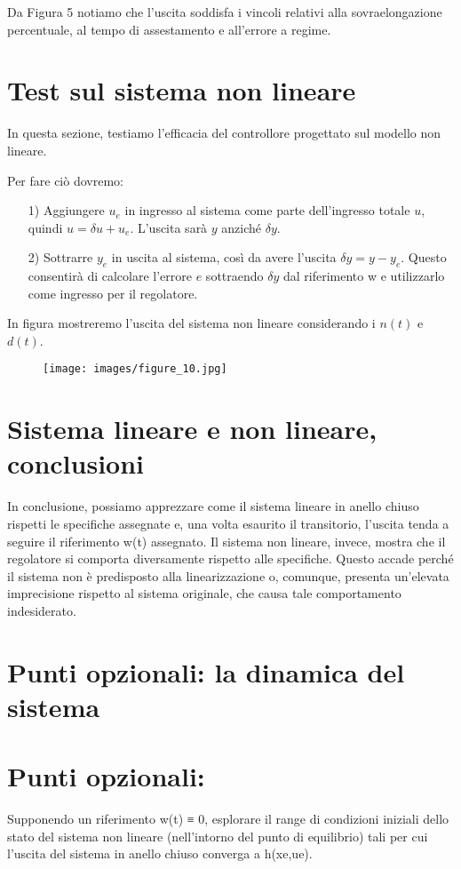 \documentclass[a4paper, 11pt]{article}
\begin{document}
Da Figura 5 notiamo che l'uscita soddisfa i vincoli relativi alla sovraelongazione percentuale, al tempo di assestamento e all'errore a regime.

\section{Test sul sistema non lineare}

In questa sezione, testiamo l'efficacia del controllore progettato sul modello non lineare.

Per fare ciò dovremo:

\begin{itemize}
	\item[1)] Aggiungere $u_e$ in ingresso al sistema come parte dell'ingresso totale $u$, quindi $u = \delta u + u_e$. L'uscita sarà $y$ anziché $\delta y$.
 \\
        \item[2)]Sottrarre $y_e$ in uscita al sistema, così da avere l'uscita $\delta y = y - y_e$. Questo consentirà di calcolare l'errore $e$ sottraendo $\delta y$ dal riferimento w e utilizzarlo come ingresso per il regolatore.
\end{itemize}

In figura mostreremo l'uscita del sistema non lineare considerando i $n(t)$ e $d(t)$.
\begin{figure}[H]
    \centering
\texttt{[image: images/figure\_10.jpg]}
    \caption{}
    \label{Figura9}
\end{figure}
\section{Sistema lineare e non lineare, conclusioni}

In conclusione, possiamo apprezzare come il sistema lineare in anello chiuso rispetti le specifiche assegnate e, una volta esaurito il transitorio, l'uscita tenda a seguire il riferimento w(t) assegnato. Il sistema non lineare, invece, mostra che il regolatore si comporta diversamente rispetto alle specifiche. Questo accade perché il sistema non è predisposto alla linearizzazione o, comunque, presenta un'elevata imprecisione rispetto al sistema originale, che causa tale comportamento indesiderato.

\section{Punti opzionali: la dinamica del sistema}



\section{Punti opzionali: }

Supponendo un riferimento w(t) ≡ 0, esplorare il range di condizioni iniziali dello stato del sistema non lineare (nell’intorno del punto di equilibrio) tali per cui l’uscita del sistema in anello chiuso converga a h(xe,ue).
\end{document}
